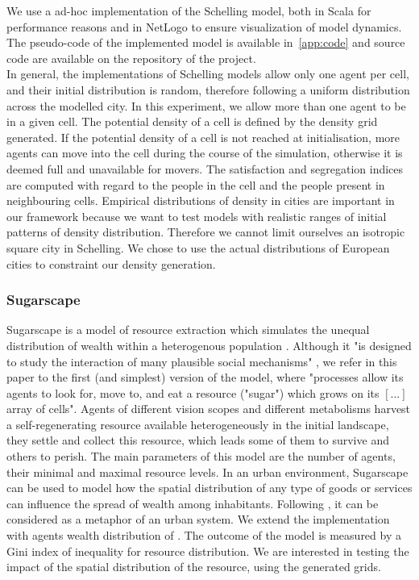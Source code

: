 \documentclass{JASSS}
\begin{document}
We use a ad-hoc implementation of the Schelling model, both in Scala for performance reasons and in NetLogo to ensure visualization of model dynamics. The pseudo-code of the implemented model is available in~\ref{app:code} and source code are available on the repository of the project.\\

In general, the implementations of Schelling models allow only one agent per cell, and their initial distribution is random, therefore following a uniform distribution across the modelled city. In this experiment, we allow more than one agent to be in a given cell. The potential density of a cell is defined by the density grid generated. If the potential density of a cell is not reached at initialisation, more agents can move into the cell during the course of the simulation, otherwise it is deemed full and unavailable for movers. The satisfaction and segregation indices are computed with regard to the people in the cell and the people present in neighbouring cells. Empirical distributions of density in cities are important in our framework because we want to test models with realistic ranges of initial patterns of density distribution. Therefore we cannot limit ourselves an isotropic square city in Schelling. We chose to use the actual distributions of European cities to constraint our density generation.

\subsubsection{Sugarscape}
Sugarscape is a model of resource extraction which simulates the unequal distribution of wealth within a heterogenous population \cite{EpsteinAxtell1996}. Although it "is designed to study the interaction of many plausible social mechanisms" \cite[p.125]{Axtelletal1996}, we refer in this paper to the first (and simplest) version of the model, where "processes allow its agents to look for, move to, and eat a resource ("sugar") which grows on its $[...]$ array of cells". Agents of different vision scopes and different metabolisms harvest a self-regenerating resource available heterogeneously in the initial landscape, they settle and collect this resource, which leads some of them to survive and others to perish. The main parameters of this model are the number of agents, their minimal and maximal resource levels. In an urban environment, Sugarscape can be used to model how the spatial distribution of any type of goods or services can influence the spread of wealth among inhabitants. Following \cite{batty2005agents}, it can be considered as a metaphor of an urban system. We extend the implementation with agents wealth distribution of \cite{li2009netlogo}. The outcome of the model is measured by a Gini index of inequality for resource distribution. We are interested in testing the impact of the spatial distribution of the resource, using the generated grids.
\end{document}

